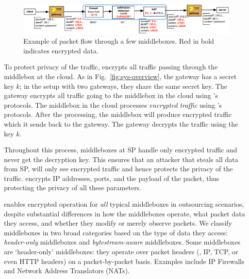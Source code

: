 \begin{figure}[t!]
\centering
  \includegraphics[width=6.7in]{fig/packetpath.pdf}
\caption{Example of packet flow through a few middleboxes. Red in bold indicates encrypted data. \label{fig:packetflow}}
\end{figure}



To protect privacy of the traffic, \sys encrypts all traffic passing through the middlebox at the cloud. 
As in Fig.~\ref{fig:sys-overview}, the gateway has a secret key $k$; in the setup with two gateways, they share
the same secret key. The gateway encrypts all traffic going to the middlebox in the cloud using \sys's protocols.
The middlebox in the cloud processes {\em encrypted traffic} using \sys's protocols. 
After the processing, the middlebox
will produce encrypted traffic which it sends back to the gateway. The gateway decrypts the traffic using the key $k$.

Throughout this process, middleboxes at SP handle only encrypted traffic and never get the decryption key. This ensures
that an attacker that steals all data from SP, will only see encrypted traffic and hence protects the privacy of the 
traffic. 
\sys encrypts IP addresses, ports, and the payload of the packet, thus protecting the privacy of all these parameters. 

\sys enables encrypted operation for {\em all} typical middleboxes in outsourcing scenarios, despite substantial differences in how the middleboxes operate, what packet data they access, and whether they modify or merely observe packets.
  We classify middleboxes in  two broad categories based on the type of data they access: {\em header-only} middleboxes and {\em bytestream-aware} middleboxes.
  Some middleboxes are `header-only' middleboxes: they operate over packet headers (\eg{}, IP, TCP, or even HTTP headers) on a packet-by-packet basis.
Examples  include IP Firewalls and Network Address Translators (NATs).


